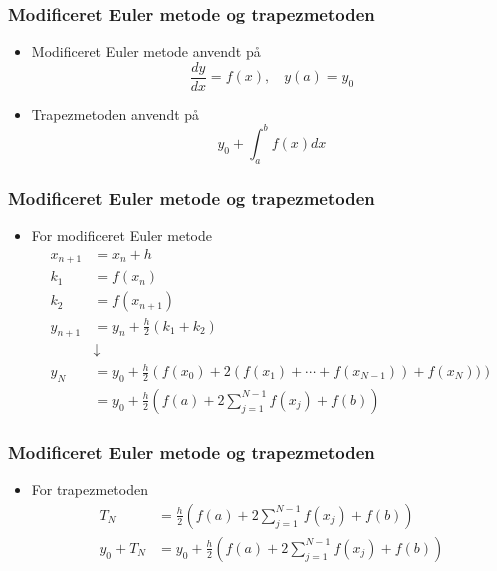\begin{frame}
\frametitle{Modificeret Euler metode og \phantom{HHHHHHH} trapezmetoden}
\begin{itemize}
\item Modificeret Euler metode anvendt på $$\frac{dy}{dx}=f(x),\phantom{hi}y(a)=y_0$$
\item Trapezmetoden anvendt på $$y_0 + \int_a^b f(x) dx$$
\end{itemize}
\end{frame}
%
\begin{frame}
\frametitle{Modificeret Euler metode og \phantom{HHHHHHH} trapezmetoden}
\begin{itemize}
\item For modificeret Euler metode
\begin{align*}
x_{n+1} &= x_n + h\\
k_1 &= f(x_n)\\
k_2 &= f(x_{n+1} )\\
y_{n+1} &= y_n + \frac{h}{2}(k_1 + k_2)\\
&\downarrow\\
y_N &= y_0 + \frac{h}{2}\left( f(x_0) + 2(f(x_1) + \cdots + f(x_{N-1})) + f(x_N) ) \right)\\
 &= y_0 + \frac{h}{2}\left(f(a) + 2\sum_{j=1}^{N-1}f(x_j) + f(b)\right)
\end{align*}
\end{itemize}
\end{frame}
%
\begin{frame}
\frametitle{Modificeret Euler metode og \phantom{HHHHHHH} trapezmetoden}
\begin{itemize}
\item For trapezmetoden
\begin{align*}
T_N &= \frac{h}{2} \left(f(a) + 2\sum_{j=1}^{N-1} f(x_j) + f(b) \right)\\
y_0 + T_N  &= y_0 + \frac{h}{2} \left(f(a) + 2\sum_{j=1}^{N-1} f(x_j) + f(b) \right)
\end{align*}
\end{itemize}
\end{frame}